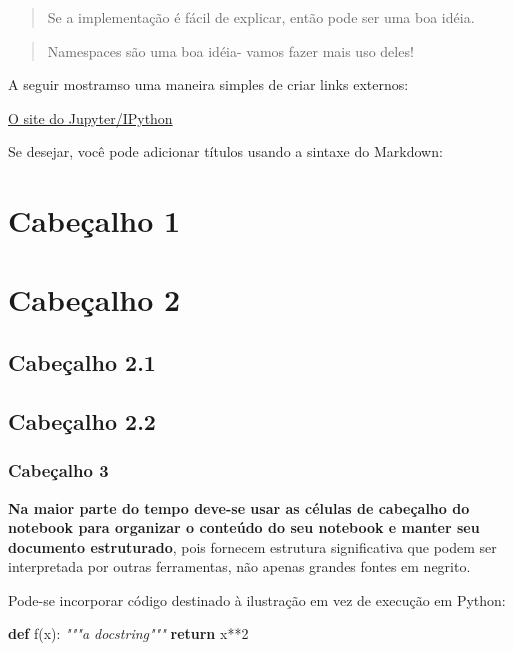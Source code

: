 \documentclass[11pt]{article}
\newenvironment{Shaded}{}{}
\newcommand{\KeywordTok}[1]{\textcolor[rgb]{0.00,0.44,0.13}{\textbf{{#1}}}}
\newcommand{\DecValTok}[1]{\textcolor[rgb]{0.25,0.63,0.44}{{#1}}}
\newcommand{\CommentTok}[1]{\textcolor[rgb]{0.38,0.63,0.69}{\textit{{#1}}}}
\newcommand{\NormalTok}[1]{{#1}}
\newcommand{\ControlFlowTok}[1]{\textcolor[rgb]{0.00,0.44,0.13}{\textbf{{#1}}}}
\newcommand{\OperatorTok}[1]{\textcolor[rgb]{0.40,0.40,0.40}{{#1}}}
\begin{document}
\begin{quote}
Se a implementação é fácil de explicar, então pode ser uma boa idéia.
\end{quote}

\begin{quote}
Namespaces são uma boa idéia- vamos fazer mais uso deles!
\end{quote}

    A seguir mostramso uma maneira simples de criar links externos:

\href{http://jupyter.org}{O site do Jupyter/IPython}

    Se desejar, você pode adicionar títulos usando a sintaxe do Markdown:

\section{Cabeçalho 1}\label{cabeuxe7alho-1}

\section{Cabeçalho 2}\label{cabeuxe7alho-2}

\subsection{Cabeçalho 2.1}\label{cabeuxe7alho-2.1}

\subsection{Cabeçalho 2.2}\label{cabeuxe7alho-2.2}

\subsubsection{Cabeçalho 3}\label{cabeuxe7alho-3}

    \textbf{Na maior parte do tempo deve-se usar as células de cabeçalho do
notebook para organizar o conteúdo do seu notebook e manter seu
documento estruturado}, pois fornecem estrutura significativa que podem
ser interpretada por outras ferramentas, não apenas grandes fontes em
negrito.

    Pode-se incorporar código destinado à ilustração em vez de execução em
Python:

\begin{Shaded}
\begin{Highlighting}[]
    \KeywordTok{def} \NormalTok{f(x):}
        \CommentTok{"""a docstring"""}
        \ControlFlowTok{return} \NormalTok{x}\OperatorTok{**}\DecValTok{2}
\end{Highlighting}
\end{Shaded}
\end{document}

